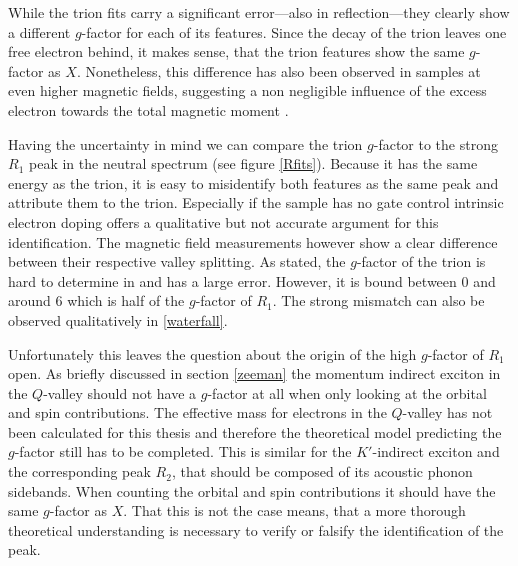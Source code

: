While the trion fits carry a significant error---also in reflection---they clearly show a different $g$-factor for each of its features. Since the decay of the trion leaves one free electron behind, it makes sense, that the trion features show the same $g$-factor as $X$. Nonetheless, this difference has also been observed in \ws samples at even higher magnetic fields, suggesting a non negligible influence of the excess electron towards the total magnetic moment \cite{plechinger_excitonic_2016}.

Having the uncertainty in mind we can compare the trion $g$-factor to the strong $R_1$ peak in the neutral spectrum (see figure \ref{Rfits}). Because it has the same energy as the trion, it is easy to misidentify both features as the same peak and attribute them to the trion. Especially if the sample has no gate control intrinsic electron doping offers a qualitative but not accurate argument for this identification. The magnetic field measurements however show a clear difference between their respective valley splitting. As stated, the $g$-factor of the trion is hard to determine in \pl and has a large error. However, it is bound between 0 and around 6 which is half of the $g$-factor of $R_1$. The strong mismatch can also be observed qualitatively in \ref{waterfall}.

Unfortunately this leaves the question about the origin of the high $g$-factor of $R_1$ open. As briefly discussed in section \ref{zeeman} the momentum indirect exciton in the $Q$-valley should not have a $g$-factor at all when only looking at the orbital and spin contributions. The effective mass for electrons in the $Q$-valley has not been calculated for this thesis and therefore the theoretical model predicting the $g$-factor still has to be completed. This is similar for the $K'$-indirect exciton and the corresponding peak $R_2$, that should be composed of its acoustic phonon sidebands. When counting the orbital and spin contributions it should have the same $g$-factor as $X$. That this is not the case means, that a more thorough theoretical understanding is necessary to verify or falsify the identification of the peak.

